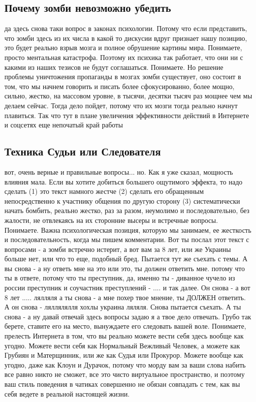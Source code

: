 \subsection{Почему зомби невозможно убедить}

да здесь снова таки вопрос в законах психологии. Потому что если представить,
что зомби здесь из их числа в какой то дискусии вдруг признает нашу позицию,
это будет реально взрыв мозга и полное обрушение картины мира. Понимаете,
просто ментальная катастрофа. Поэтому их психика так работает, что они ни с
какими из наших тезисов не будут соглашаться. Понимаете. Но решение проблемы
уничтожения пропаганды в мозгах зомби существует, оно состоит в том, что мы
начнем говорить и писать более сфокусированно, более мощно, сильно, жестко, на
массовом уровне, в тысячи, десятки тысяч раз мощнее чем мы делаем сейчас. Тогда
дело пойдет, потому что их мозги тогда реально начнут плавиться. Так что тут в
плане увеличения эффективности действий в Интернете и соцсетях еще непочатый
край работы

\subsection{Техника Судьи или Следователя}

вот, очень верные и правильные вопросы... но. Как я уже сказал, мощность
влияния мала. Если вы хотите добиться большего ощутимого эффекта, то надо
сделать (1) это текст намного жестче (2) сделать его обращенным непосредственно
к участнику общения по другую сторону (3) систематически начать бомбить,
реально жестко, раз за разом, неумолимо и последовательно, без жалости, не
отвлекаясь на их сторонние высеры и встречные вопросы. Понимаете. Важна
психологическая позиция, которую мы занимаем, ее жесткость и
последовательность, когда мы пишем комментарии. Вот ты послал этот текст с
вопросами - а зомби встречно истерит, а вот вам за 8 лет, или же Украины больше
нет, или что то еще, подобный бред. Пытается тут же съехать с темы. А вы снова
- а ну ответь мне на это или это, ты должен ответить мне. потому что ты в
ответе, потому что ты преступник, да, именно ты - диванное чучело из россии
преступник и соучастник преступлений - .... и так далее. Он снова - а вот 8 лет
..... лялляля а ты снова - а мне похер твое мнение, ты ДОЛЖЕН ответить. А он
снова - ляллялялля хохлы украина ляляля. Снова пытается съехать. А ты снова - а
ну давай отвечай здесь вопросы задаю я а твое дело отвечать. Грубо так берете,
ставите его на место, вынуждаете его следовать вашей воле. Понимаете, прелесть
Интернета в том, что вы реально можете вести себя здесь вообще как угодно.
Можете вести себя как Нормальный Вежливый Человек, а можете как Грубиян и
Матерщинник, или же как Судья или Прокурор. Можете вообще как угодно, даже как
Клоун и Дурачок, потому что морду вам за ваши слова набить все равно никто не
сможет, все это чисто виртуальное пространство, и поэтому ваш стиль поведения в
чатиках совершенно не обязан совпадать с тем, как вы себя ведете в реальной
настоящей жизни.

